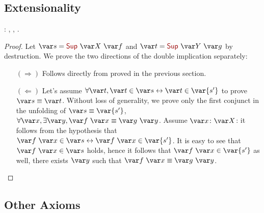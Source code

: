 \subsection{Extensionality}
\TODO{}


\begin{coqdoccode}
  \coqdocnoindent
   : \coqdockw{\ensuremath{\forall}}  ,     \coqdockw{\ensuremath{\forall}} ,       .\coqdoceol
\end{coqdoccode}
\begin{proof}
  Let $\var s = \coqdocconstructor{Sup}~\var X~\var f$ and $\var t = \coqdocconstructor{Sup}~\var Y~\var g$ by destruction.
  We prove the two directions of the double implication separately:
  \begin{itemize}
    \item[$(\Rightarrow)$] Follows directly from  proved in the previous section.

    \item[$(\Leftarrow)$] Let's assume $\forall \var t, \var t\in \var s \leftrightarrow \var t \in \var{s'}$ to prove $\var s \equiv \var t$. Without loss of generality, we prove only the first conjunct in the unfolding of $\var s \equiv \var {s'}$, \ie{} $\forall \var x, \exists \var y, \var f~\var x \equiv \var g~\var y$. Assume $\var x\colon \var X$: it follows from the hypothesis that $\var f~\var x\in \var s \leftrightarrow \var f~\var x \in \var{s'}$. It is easy to see that $\var f~\var x\in \var s$ holds, hence it follows that $\var f~\var x \in \var{s'}$ as well, \ie{} there exists $\var y$ such that $\var f~\var x \equiv \var g~\var y$.
    \qedhere
  \end{itemize}
\end{proof}

\subsection{Other \ZF{} Axioms}
\TODO{}
